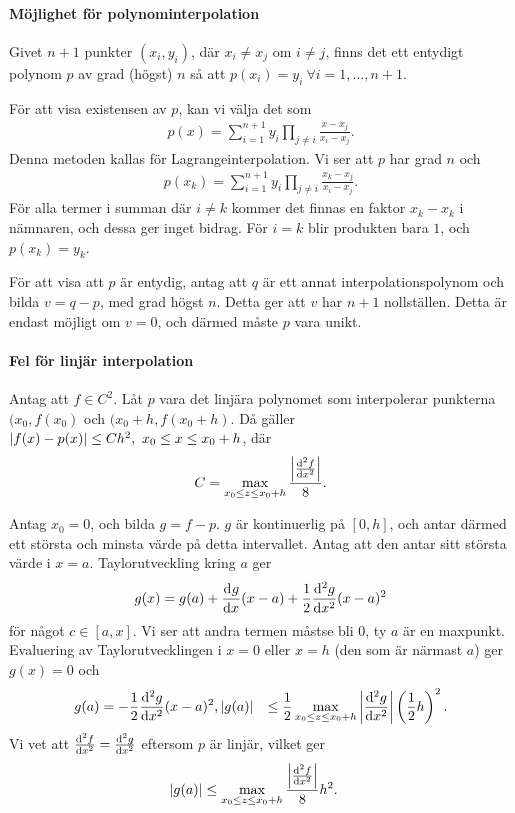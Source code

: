 \paragraph{Möjlighet för polynominterpolation}
Givet $n + 1$ punkter $(x_{i}, y_{i})$, där $x_{i}\neq x_{j}$ om $i\neq j$, finns det ett entydigt polynom $p$ av grad (högst) $n$ så att $p(x_{i}) = y_{i}\ \forall i= 1, \dots, n + 1$.

\proof
För att visa existensen av $p$, kan vi välja det som
\begin{align*}
	p(x) = \sum\limits_{i = 1}^{n + 1}y_{i}\prod\limits_{j\neq i}\frac{x - x_{j}}{x_{i} - x_{j}}.
\end{align*}
Denna metoden kallas för Lagrangeinterpolation. Vi ser att $p$ har grad $n$ och
\begin{align*}
	p(x_{k}) = \sum\limits_{i = 1}^{n + 1}y_{i}\prod\limits_{j\neq i}\frac{x_{k} - x_{j}}{x_{i} - x_{j}}.
\end{align*}
För alla termer i summan där $i\neq k$ kommer det finnas en faktor $x_{k} - x_{k}$ i nämnaren, och dessa ger inget bidrag. För $i = k$ blir produkten bara $1$, och $p(x_{k}) = y_{k}$.

För att visa att $p$ är entydig, antag att $q$ är ett annat interpolationspolynom och bilda $v = q - p$, med grad högst $n$. Detta ger att $v$ har $n + 1$ nollställen. Detta är endast möjligt om $v = 0$, och därmed måste $p$ vara unikt.

\paragraph{Fel för linjär interpolation}
Antag att $f\in C^{2}$. Låt $p$ vara det linjära polynomet som interpolerar punkterna $(x_{0}, f(x_{0})$ och $(x_{0} + h, f(x_{0} + h)$. Då gäller $\abs{f(x) - p(x)} \leq Ch^{2},\ x_{0} \leq x \leq x_{0} + h$, där
\begin{align*}
	C = \max\limits_{x_{0} \leq z \leq x_{0} + h}\frac{\abs{\dv[2]{f}{x} (z)}}{8}.
\end{align*}

\proof
Antag $x_{0} = 0$, och bilda $g = f - p$. $g$ är kontinuerlig på $[0, h]$, och antar därmed ett största och minsta värde på detta intervallet. Antag att den antar sitt största värde i $x = a$. Taylorutveckling kring $a$ ger
\begin{align*}
	g(x) = g(a) + \dv[]{g}{x} (a)(x - a) + \frac{1}{2}\dv[2]{g}{x} (c)(x - a)^{2}
\end{align*}
för något $c\in [a, x]$. Vi ser att andra termen måstse bli $0$, ty $a$ är en maxpunkt. Evaluering av Taylorutvecklingen i $x = 0$ eller $x = h$ (den som är närmast $a$) ger $g(x) = 0$ och
\begin{align*}
	g(a)       &= -\frac{1}{2}\dv[2]{g}{x} (c)(x - a)^{2},
	\abs{g(a)} &\leq \frac{1}{2}\max\limits_{x_{0} \leq z \leq x_{0} + h}\abs{\dv[2]{g}{x} (z)}\left(\frac{1}{2}h\right)^{2}.
\end{align*}
Vi vet att $\dv[2]{f}{x} (x) = \dv[2]{g}{x} (x)$ eftersom $p$ är linjär, vilket ger
\begin{align*}
	\abs{g(a)} &\leq \max\limits_{x_{0} \leq z \leq x_{0} + h}\frac{\abs{\dv[2]{f}{x} (z)}}{8}h^{2}.
\end{align*}

